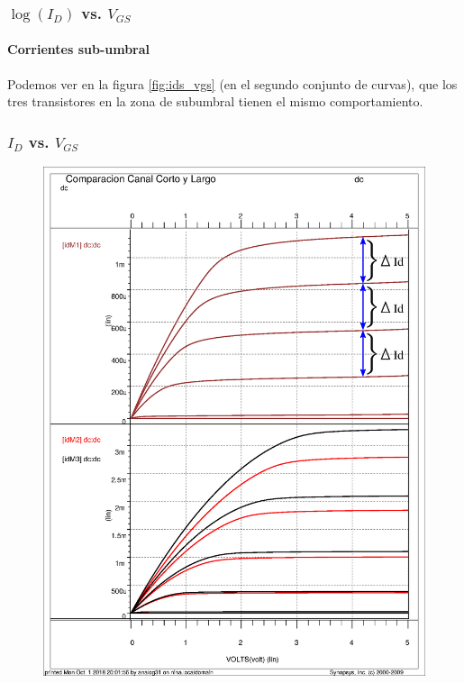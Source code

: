 \subsubsection{$\log{(I_D)}$ vs. $V_{GS}$} 

\paragraph{Corrientes sub-umbral}
Podemos ver en la figura \ref{fig:ids_vgs} (en el segundo conjunto de curvas), que los tres transistores en la zona de subumbral tienen el mismo comportamiento.


\subsubsection{$I_D$ vs. $V_{GS}$}
\begin{figure}
\includegraphics[scale=0.56]{images/parametric}
	\label{fig:parametric}
\end{figure}

